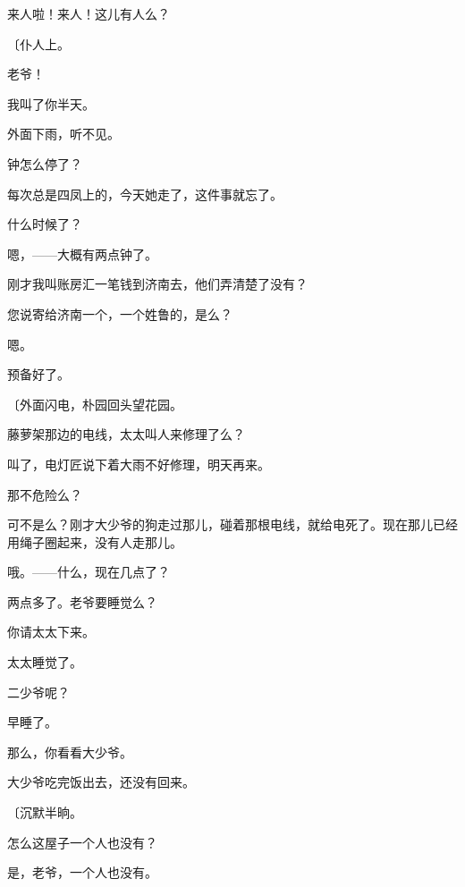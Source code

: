 来人啦！来人！这儿有人么？

{\fangsong〔仆人上。}

老爷！

我叫了你半天。

外面下雨，听不见。

钟怎么停了？

每次总是四凤上的，今天她走了，这件事就忘了。

什么时候了？

嗯，——大概有两点钟了。

刚才我叫账房汇一笔钱到济南去，他们弄清楚了没有？

您说寄给济南一个，一个姓鲁的，是么？

嗯。

预备好了。

{\fangsong〔外面闪电，朴园回头望花园。}

藤萝架那边的电线，太太叫人来修理了么？

叫了，电灯匠说下着大雨不好修理，明天再来。

那不危险么？

可不是么？刚才大少爷的狗走过那儿，碰着那根电线，就给电死了。现在那儿已经用绳子圈起来，没有人走那儿。

哦。——什么，现在几点了？

两点多了。老爷要睡觉么？

你请太太下来。

太太睡觉了。

二少爷呢？

早睡了。

那么，你看看大少爷。

大少爷吃完饭出去，还没有回来。

{\fangsong〔沉默半晌。}

怎么这屋子一个人也没有？

是，老爷，一个人也没有。

